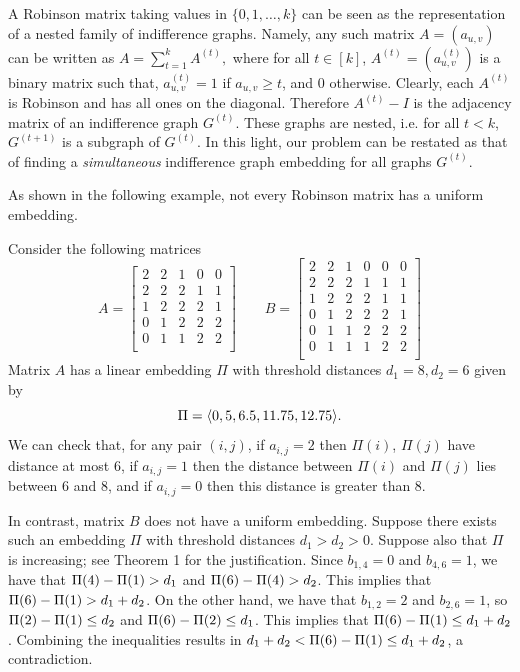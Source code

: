 \documentclass[runningheads]{llncs}
\begin{document}
A Robinson matrix taking values in $\{ 0,1,\dots ,k\}$ can be seen as the representation of a nested family of indifference graphs. Namely, any such matrix $A=(a_{u,v})$ can be written as
$A =  \sum_{t = 1}^k A^{(t)},$ 
where for all $t\in [k]$, $A^{(t)}=(a^{(t)}_{u,v})$ is a binary matrix such that, $a^{(t)}_{u,v}=1$ if $a_{u,v}\geq t$, and 0 otherwise. Clearly, each $A^{(t)}$ is Robinson and has all ones on the diagonal. Therefore $A^{(t)}-I$ is the adjacency matrix of an indifference graph $G^{(t)}$. These graphs are nested, i.e. for all $t<k$, $G^{(t+1)}$ is a subgraph of $G^{(t)}$. In this light, our problem can be restated as that of finding a \emph{simultaneous} indifference graph embedding for all graphs $G^{(t)}$.



As shown in the following example, not every Robinson matrix has a uniform embedding. \begin{example}\label{example:counter-example}
Consider the following matrices 
$$
A = \left[\begin{array}{ccccc}
 2& 2& 1& 0& 0 \\ 
 2& 2& 2& 1& 1 \\
 1& 2& 2& 2& 1 \\
0& 1& 2& 2& 2 \\
0& 1& 1& 2& 2 \\
\end{array}\right]
\qquad
B = \left[
\begin{array}{cccccc}
 2& 2& 1& 0& 0& 0 \\
2& 2& 2& 1& 1& 1 \\
1& 2& 2& 2& 1& 1 \\
0& 1& 2& 2& 2& 1 \\
0& 1& 1& 2& 2& 2 \\
0& 1& 1& 1& 2& 2 \\
\end{array}
\right]
$$ 
Matrix $A$ has a linear embedding $\Pi$ with threshold distances $d_1=8, d_2=6$ given by
\[
\Pi = \path{0, 5, 6.5, 11.75, 12.75}.
\]
We can check that, for any pair $(i,j)$, if  $a_{i,j}=2$ then $\Pi(i)$, $\Pi(j)$ have distance at most 6, if $a_{i,j}=1$ then the distance between $\Pi(i)$ and $\Pi(j)$ lies between 6 and 8, and if  $a_{i,j}=0$ then this distance is greater than 8.

In contrast, matrix $B$ does not have a uniform embedding. Suppose there exists such an embedding $\Pi$ with threshold distances $d_1> d_2>0$. Suppose also that $\Pi$ is increasing; see Theorem 1 for the justification. 
Since $b_{1,4}=0$ and $b_{4,6}=1$, we have that $\dist 14> d_1$ and $\dist 46>d_2$. This implies that  $\dist16 > d_1 + d_2$. 
On the other hand, we have that $b_{1,2}=2$ and $b_{2,6}=1$, so
$\dist12\leq d_2$ and  $\dist26\leq d_1$. This implies that $\dist16\leq d_1+d_2$. 
Combining the inequalities results in  $d_1 + d_2<\dist16\leq d_1+d_2$,  a contradiction. 

\end{example}
\end{document}
